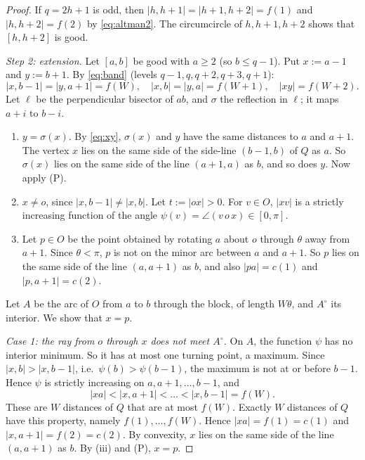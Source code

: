 \begin{proof}
If $q=2h+1$ is odd, then $|h,h+1|=|h+1,h+2|=f(1)$ and $|h,h+2|=f(2)$ by \eqref{eq:altman2}. The circumcircle of $h,h+1,h+2$ shows that $[h,h+2]$ is good.

\emph{Step 2: extension.} Let $[a,b]$ be good with $a\ge2$ (so $b\le q-1$). Put $x:=a-1$ and $y:=b+1$. By \eqref{eq:band} (levels $q-1,q,q+2,q+3,q+1$):
\begin{equation}\label{eq:xy}
|x,b-1|=|y,a+1|=f(W),\quad |x,b|=|y,a|=f(W+1),\quad |xy|=f(W+2).
\end{equation}
Let $\ell$ be the perpendicular bisector of $ab$, and $\sigma$ the reflection in $\ell$; it maps $a+i$ to $b-i$.
\begin{enumerate}[leftmargin=2em,label=(\roman*)]
\item $y=\sigma(x)$. By \eqref{eq:xy}, $\sigma(x)$ and $y$ have the same distances to $a$ and $a+1$. The vertex $x$ lies on the same side of the side-line $(b-1,b)$ of $Q$ as $a$. So $\sigma(x)$ lies on the same side of the line $(a+1,a)$ as $b$, and so does $y$. Now apply (P).
\item $x\ne o$, since $|x,b-1|\ne|x,b|$. Let $t:=|ox|>0$. For $v\in O$, $|xv|$ is a strictly increasing function of the angle $\psi(v)=\angle(v\,o\,x)\in[0,\pi]$.
\item Let $p\in O$ be the point obtained by rotating $a$ about $o$ through $\theta$ away from $a+1$. Since $\theta<\pi$, $p$ is not on the minor arc between $a$ and $a+1$. So $p$ lies on the same side of the line $(a,a+1)$ as $b$, and also $|pa|=c(1)$ and $|p,a+1|=c(2)$.
\end{enumerate}
Let $A$ be the arc of $O$ from $a$ to $b$ through the block, of length $W\theta$, and $A^\circ$ its interior. We show that $x=p$.

\emph{Case 1: the ray from $o$ through $x$ does not meet $A^\circ$.} On $A$, the function $\psi$ has no interior minimum. So it has at most one turning point, a maximum. Since $|x,b|>|x,b-1|$, i.e.\ $\psi(b)>\psi(b-1)$, the maximum is not at or before $b-1$. Hence $\psi$ is strictly increasing on $a,a+1,\dots,b-1$, and
\[
|xa|<|x,a+1|<\dots<|x,b-1|=f(W).
\]
These are $W$ distances of $Q$ that are at most $f(W)$. Exactly $W$ distances of $Q$ have this property, namely $f(1),\dots,f(W)$. Hence $|xa|=f(1)=c(1)$ and $|x,a+1|=f(2)=c(2)$. By convexity, $x$ lies on the same side of the line $(a,a+1)$ as $b$. By (iii) and (P), $x=p$.


\end{proof}
